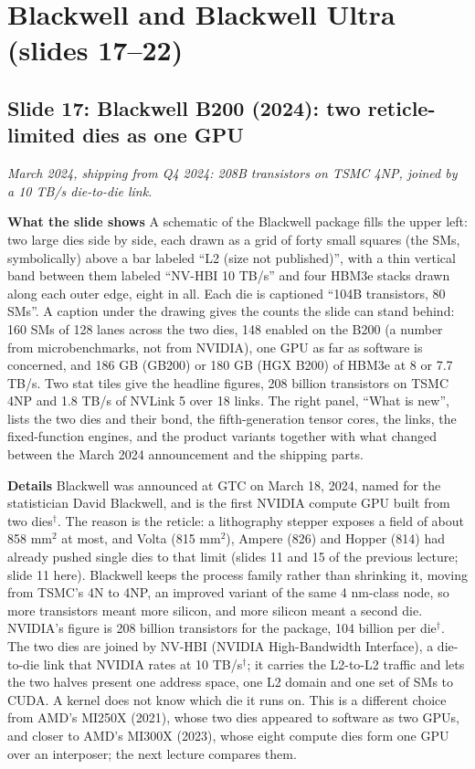 \documentclass[11pt,letterpaper]{article}
\newcommand{\setstage}[1]{\colorlet{stagec}{#1}}
\newcommand{\slide}[3]{%
  \subsection[Slide #1: #2]{Slide #1: #2}%
  {\color{muted}\itshape #3\par}\medskip}
\newcommand{\para}[1]{\medskip\noindent\textbf{#1}\quad}
\begin{document}
\setstage{posc}
\section{Blackwell and Blackwell Ultra (slides 17--22)}

\slide{17}{Blackwell B200 (2024): two reticle-limited dies as one GPU}{March 2024, shipping from Q4 2024: 208B transistors on TSMC 4NP, joined by a 10 TB/s die-to-die link.}

\para{What the slide shows} A schematic of the Blackwell package fills the upper left: two large dies side by side, each drawn as a grid of forty small squares (the SMs, symbolically) above a bar labeled ``L2 (size not published)'', with a thin vertical band between them labeled ``NV-HBI 10 TB/s'' and four HBM3e stacks drawn along each outer edge, eight in all. Each die is captioned ``104B transistors, 80 SMs''. A caption under the drawing gives the counts the slide can stand behind: 160 SMs of 128 lanes across the two dies, 148 enabled on the B200 (a number from microbenchmarks, not from NVIDIA), one GPU as far as software is concerned, and 186 GB (GB200) or 180 GB (HGX B200) of HBM3e at 8 or 7.7 TB/s. Two stat tiles give the headline figures, 208 billion transistors on TSMC 4NP and 1.8 TB/s of NVLink 5 over 18 links. The right panel, ``What is new'', lists the two dies and their bond, the fifth-generation tensor cores, the links, the fixed-function engines, and the product variants together with what changed between the March 2024 announcement and the shipping parts.

\para{Details} Blackwell was announced at GTC on March 18, 2024, named for the statistician David Blackwell, and is the first NVIDIA compute GPU built from two dies$^\dagger$. The reason is the reticle: a lithography stepper exposes a field of about 858 mm$^2$ at most, and Volta (815 mm$^2$), Ampere (826) and Hopper (814) had already pushed single dies to that limit (slides 11 and 15 of the previous lecture; slide 11 here). Blackwell keeps the process family rather than shrinking it, moving from TSMC's 4N to 4NP, an improved variant of the same 4 nm-class node, so more transistors meant more silicon, and more silicon meant a second die. NVIDIA's figure is 208 billion transistors for the package, 104 billion per die$^\dagger$. The two dies are joined by NV-HBI (NVIDIA High-Bandwidth Interface), a die-to-die link that NVIDIA rates at 10 TB/s$^\dagger$; it carries the L2-to-L2 traffic and lets the two halves present one address space, one L2 domain and one set of SMs to CUDA. A kernel does not know which die it runs on. This is a different choice from AMD's MI250X (2021), whose two dies appeared to software as two GPUs, and closer to AMD's MI300X (2023), whose eight compute dies form one GPU over an interposer; the next lecture compares them.
\end{document}
